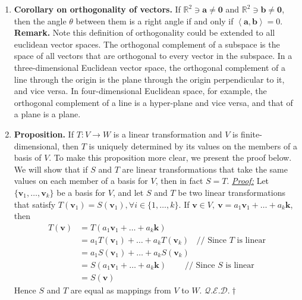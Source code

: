 \documentclass[oneside, 12pt]{book}
\newcommand{\settag}[1]{\renewcommand{\theenumi}{#1}}
\newcommand{\R}{\mathbb{R}}
\newcommand{\qed}{\hfill $\mathcal{Q}.\mathcal{E}.\mathcal{D}.\dagger$}
\newcommand{\tbf}[1]{\textbf{#1}}
\newcommand{\tit}[1]{\textit{#1}}
\newcommand{\proof}{\tit{\underline{Proof:}}} %
\begin{document}
\begin{enumerate}
        \settag{2.1.10}
        \item \tbf{Corollary on orthogonality of vectors.} If $\R^2\ni \mathbf{a}\neq \mathbf{0}$ and $\R^2\ni \mathbf{b}\neq \mathbf{0}$, then the angle $\theta$ between them is a right angle if and only if $\left<\mathbf{a},\mathbf{b}\right>=0$.\newline
        \tbf{Remark.} Note this definition of orthogonality could be extended to all euclidean vector spaces. The orthogonal complement of a subspace is the space of all vectors that are orthogonal to every vector in the subspace. In a three-dimensional Euclidean vector space, the orthogonal complement of a line through the origin is the plane through the origin perpendicular to it, and vice versa. In four-dimensional Euclidean space, for example, the orthogonal complement of a line is a hyper-plane and vice versa, and that of a plane is a plane.
        
        \settag{2.1.14}
        \item \tbf{Proposition.} If $T:V\xrightarrow{}W$ is a linear transformation and $V$ is finite-dimensional, then $T$ is uniquely determined by its values on the members of a basis of $V$. To make this proposition more clear, we present the proof below. We will show that if $S$ and $T$ are linear transformations that take the same values on each member of a basis for $V$, then in fact $S=T$.\newline
        \proof \newline
        Let $\{ \mathbf{v}_1, \ldots, \mathbf{v}_k\}$ be a basis for $V$, and let $S$ and $T$ be two linear transformations that satisfy $T(\mathbf{v}_1)=S(\mathbf{v}_1), \forall i \in \{1,\ldots,k\}$. If $\mathbf{v}\in V, ~\mathbf{v} = a_1\mathbf{v}_1 + \ldots + a_k\mathbf{k}$, then
        \begin{align*}
            T(\mathbf{v}) &= T(a_1\mathbf{v}_1 + \ldots + a_k\mathbf{k}) \\
            &= a_1T(\mathbf{v}_1) + \ldots + a_k T(\mathbf{v}_k)~~~~\text{// Since $T$ is linear}\\
            &= a_1S(\mathbf{v}_1) + \ldots + a_k S(\mathbf{v}_k) \\
            &= S(a_1\mathbf{v}_1 + \ldots + a_k\mathbf{k})~~~~~~~~~~\text{//  Since $S$ is linear} \\
            &=S(\mathbf{v})
        \end{align*}
        Hence $S$ and $T$ are equal as mappings from $V$ to $W$. \qed
        
    \end{enumerate}
    
\end{document}
